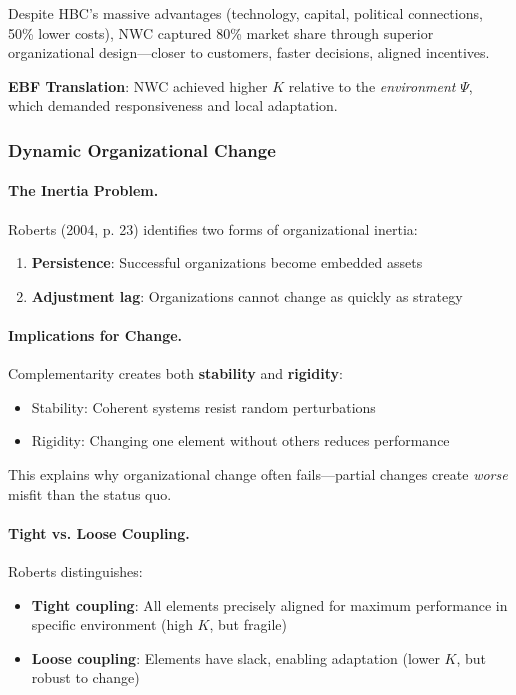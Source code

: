 Despite HBC's massive advantages (technology, capital, political connections, 
50\% lower costs), NWC captured 80\% market share through superior 
organizational design---closer to customers, faster decisions, aligned incentives.

\textbf{EBF Translation}: NWC achieved higher $K$ relative to the 
\textit{environment} $\Psi$, which demanded responsiveness and local adaptation.

\subsubsection{Dynamic Organizational Change}

\paragraph{The Inertia Problem.}
Roberts (2004, p. 23) identifies two forms of organizational inertia:
\begin{enumerate}
    \item \textbf{Persistence}: Successful organizations become embedded assets
    \item \textbf{Adjustment lag}: Organizations cannot change as quickly as strategy
\end{enumerate}

\paragraph{Implications for Change.}
Complementarity creates both \textbf{stability} and \textbf{rigidity}:
\begin{itemize}
    \item Stability: Coherent systems resist random perturbations
    \item Rigidity: Changing one element without others reduces performance
\end{itemize}

This explains why organizational change often fails---partial changes create 
\textit{worse} misfit than the status quo.

\paragraph{Tight vs. Loose Coupling.}
Roberts distinguishes:
\begin{itemize}
    \item \textbf{Tight coupling}: All elements precisely aligned for maximum 
          performance in specific environment (high $K$, but fragile)
    \item \textbf{Loose coupling}: Elements have slack, enabling adaptation 
          (lower $K$, but robust to change)
\end{itemize}

